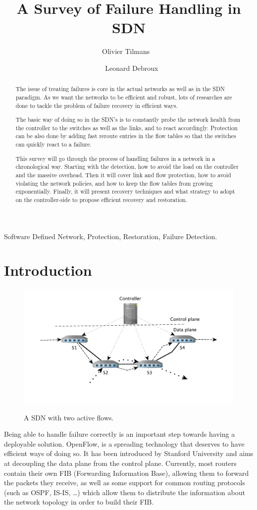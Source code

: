 \documentclass[]{IEEEtran}
\author{Olivier Tilmans ~\and~ Leonard Debroux}
\title{A Survey of Failure Handling in SDN}
\begin{document}
\maketitle
\begin{abstract}
The issue of treating failures is core in the actual networks as well as in the SDN paradigm. As we want the networks to be efficient and robust, lots of researches are done to tackle the problem of failure recovery in efficient ways.

The basic way of doing so in the SDN's is to constantly probe the network health from the controller to the switches as well as the links, and to react accordingly. Protection can be also done by adding fast reroute entries in the flow tables so that the switches can quickly react to a failure.

This survey will go through the process of handling failures in a network in a chronological way. Starting with the detection, how to avoid the load on the controller and the massive overhead. Then it will cover link and flow protection, how to avoid violating the network policies, and how to keep the flow tables from growing exponentially. Finally, it will present recovery techniques and what strategy to adopt on the controller-side to propose efficient recovery and restoration.
\end{abstract}

\begin{IEEEkeywords}
Software Defined Network, Protection, Restoration, Failure Detection.
\end{IEEEkeywords}

\section{Introduction}
\begin{figure}
	\includegraphics[width=.53\textwidth]{images/sdn.pdf}
	\label{fig:sdn}
	\caption{A SDN with two active flows.}
\end{figure}
Being able to handle failure correctly is an important step towards having a deployable solution. OpenFlow, is a spreading technology that deserves to have efficient ways of doing so. It has been introduced by Stanford University and aims at decoupling the data plane from the control plane. Currently, most routers contain their own FIB (Forwarding Information Base), allowing them to forward the packets they receive, as well as some support for common routing protocols (such as OSPF, IS-IS, \ldots) which allow them to distribute the information about the network topology in order to build their FIB.
\end{document}
